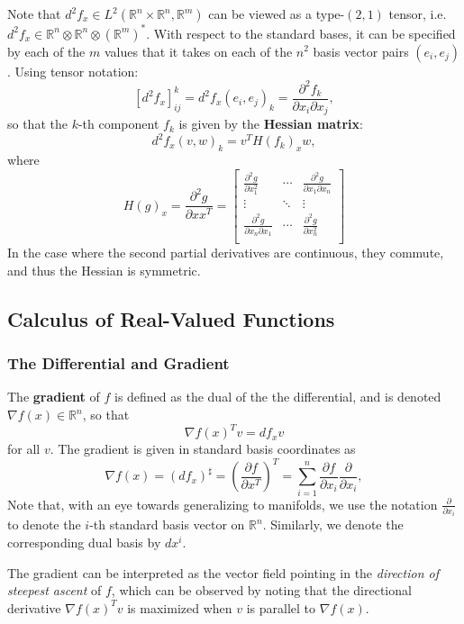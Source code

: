 \documentclass[reqno]{amsart}
\numberwithin{equation}{section}
\begin{document}
Note that $d^2f_x \in L^2(\mathbb R^n \times \mathbb R^n, \mathbb R^m)$ can be viewed as
a type-$(2, 1)$ tensor, i.e. $d^2f_x \in \mathbb R^n \otimes \mathbb R^n \otimes (\mathbb R^m)^*$.
With respect to the standard bases, it can be specified by each of the
$m$ values that it takes on each of the $n^2$ basis vector pairs $(e_i, e_j)$. Using tensor
notation:
$$
    [d^2f_x]_{ij}^k = d^2f_x(e_i,e_j)_k = \frac{\partial^2 f_k}{\partial x_i \partial x_j},
$$
so that the $k$-th component $f_k$ is given by the \textbf{Hessian matrix}:
$$
    d^2f_x(v,w)_k = v^T  H(f_k)_x w,
$$
where
$$
    H(g)_x = \frac{\partial^2 g}{\partial x x^T} =
        \begin{bmatrix} \frac{\partial^2 g}{\partial x_1^2} & \cdots & \frac{\partial^2 g}{\partial x_1 \partial x_n} \\
        \vdots & \ddots & \vdots \\ 
        \frac{\partial^2 g}{\partial x_n \partial x_1} & \cdots & \frac{\partial^2 g}{\partial x_n^2} \\
        \end{bmatrix}
$$
In the case where the second partial derivatives are continuous, they commute, and thus
the Hessian is symmetric.

\subsection{Calculus of Real-Valued Functions}


\subsubsection{The Differential and Gradient}

The \textbf{gradient} of $f$ is defined as the dual of the the differential,
and is denoted $\nabla f(x) \in \mathbb R^n$, so that
$$
    \nabla f(x)^Tv = df_x v
$$
for all $v$. The gradient is given in standard basis coordinates as
$$
    \nabla f(x) = (df_x)^{\sharp} = \left(\frac{\partial f}{\partial x^T}\right)^T = \sum_{i=1}^n \frac{\partial f}{\partial x_i} \frac{\partial}{\partial x_i},
$$
Note that, with an eye towards generalizing to manifolds, we use the notation $\frac{\partial}{\partial x_i}$ to
denote the $i$-th standard basis vector on $\mathbb R^n$. Similarly, we denote the corresponding dual basis by
$d x^i$.

The gradient can be interpreted as the vector field pointing in the
\emph{direction of steepest ascent} of $f$, which can be observed by noting that the directional
derivative $\nabla f(x)^T v$ is maximized when $v$ is parallel to $\nabla f(x)$.
\end{document}
